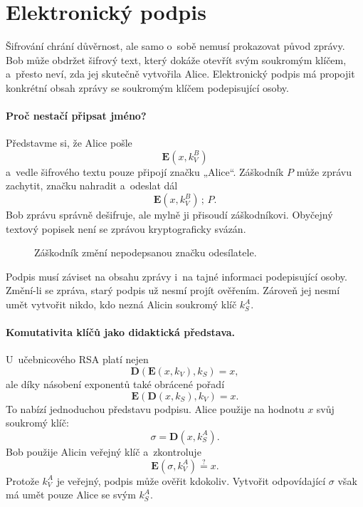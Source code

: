 \section{Elektronický podpis}\label{sec:krypto-podpis}

Šifrování chrání důvěrnost, ale samo o~sobě nemusí prokazovat původ zprávy. Bob může obdržet šifrový text, který dokáže otevřít svým soukromým klíčem, a~přesto neví, zda jej skutečně vytvořila Alice. Elektronický podpis má propojit konkrétní obsah zprávy se soukromým klíčem podepisující osoby.

\paragraph{Proč nestačí připsat jméno?}

Představme si, že Alice pošle
\[
    \mathbf{E}(x,k_V^B)
\]
a~vedle šifrového textu pouze připojí značku „Alice“. Záškodník $P$ může zprávu zachytit, značku nahradit a~odeslat dál
\[
    \mathbf{E}(x,k_V^B)\,;\,P.
\]
Bob zprávu správně dešifruje, ale mylně ji přisoudí záškodníkovi. Obyčejný textový popisek není se zprávou kryptograficky svázán.

\begin{figure}[ht]
    \centering
    
    \caption{Záškodník změní nepodepsanou značku odesílatele.}
    \label{fig:krypto-podpis-utok}
\end{figure}

Podpis musí záviset na obsahu zprávy i~na tajné informaci podepisující osoby. Změní-li se zpráva, starý podpis už nesmí projít ověřením. Zároveň jej nesmí umět vytvořit nikdo, kdo nezná Alicin soukromý klíč $k_S^A$.

\paragraph{Komutativita klíčů jako didaktická představa.}

U~učebnicového RSA platí nejen
\[
    \mathbf{D}\left(\mathbf{E}(x,k_V),k_S\right)=x,
\]
ale díky násobení exponentů také obrácené pořadí
\[
    \mathbf{E}\left(\mathbf{D}(x,k_S),k_V\right)=x.
\]
To nabízí jednoduchou představu podpisu. Alice použije na hodnotu $x$ svůj soukromý klíč:
\[
    \sigma=\mathbf{D}(x,k_S^A).
\]
Bob použije Alicin veřejný klíč a~zkontroluje
\[
    \mathbf{E}(\sigma,k_V^A)\stackrel{?}{=}x.
\]
Protože $k_V^A$ je veřejný, podpis může ověřit kdokoliv. Vytvořit odpovídající $\sigma$ však má umět pouze Alice se svým $k_S^A$.

